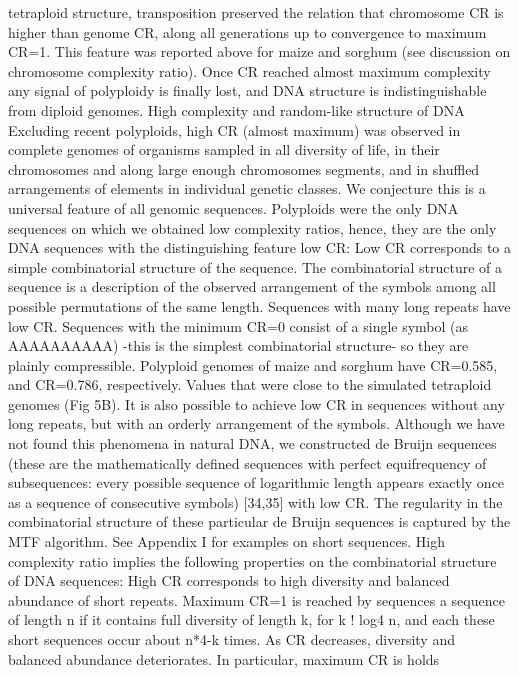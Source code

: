 tetraploid structure, transposition preserved the relation that chromosome CR is higher than
genome CR, along all generations up to convergence to maximum CR=1. This feature was
reported above for maize and sorghum (see discussion on chromosome complexity ratio).
Once CR reached almost maximum complexity any signal of polyploidy is finally lost, and
DNA structure is indistinguishable from diploid genomes.
High complexity and random-like structure of DNA
Excluding recent polyploids, high CR (almost maximum) was observed in complete genomes
of organisms sampled in all diversity of life, in their chromosomes and along large enough
chromosomes segments, and in shuffled arrangements of elements in individual genetic
classes. We conjecture this is a universal feature of all genomic sequences.
Polyploids were the only DNA sequences on which we obtained low complexity ratios,
hence, they are the only DNA sequences with the distinguishing feature low CR:
Low CR corresponds to a simple combinatorial structure of the sequence. The
combinatorial structure of a sequence is a description of the observed arrangement of the
symbols among all possible permutations of the same length. Sequences with many long
repeats have low CR. Sequences with the minimum CR=0 consist of a single symbol (as
AAAAAAAAAA) -this is the simplest combinatorial structure- so they are plainly
compressible. Polyploid genomes of maize and sorghum have CR=0.585, and CR=0.786,
respectively. Values that were close to the simulated tetraploid genomes (Fig 5B). It is also
possible to achieve low CR in sequences without any long repeats, but with an orderly
arrangement of the symbols. Although we have not found this phenomena in natural DNA,
we constructed de Bruijn sequences (these are the mathematically defined sequences with
perfect equifrequency of subsequences: every possible sequence of logarithmic length
appears exactly once as a sequence of consecutive symbols) [34,35] with low CR. The
regularity in the combinatorial structure of these particular de Bruijn sequences is captured by
the MTF algorithm. See Appendix I for examples on short sequences.
High complexity ratio implies the following properties on the combinatorial structure of DNA
sequences:
High CR corresponds to high diversity and balanced abundance of short repeats.
Maximum CR=1 is reached by sequences a sequence of length n if it contains full diversity of
length k, for k ! log4 n, and each these short sequences occur about n*4-k times. As CR
decreases, diversity and balanced abundance deteriorates. In particular, maximum CR is holds
